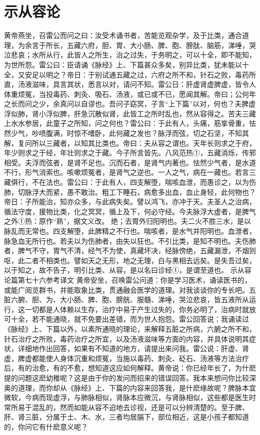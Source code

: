 \documentclass[a4paper,12pt,UTF8,twoside]{ctexbook}
\begin{document}
\chapter{示从容论}

黄帝燕坐，召雷公而问之曰：汝受术诵书者，苦能览观杂学，及于比类，通合道理，为余言于所长，五藏六府，胆、胃、大小肠、脾、胞、膀肽、脑筋，涕唾，哭泣悲哀；水所从行，此皆人之所生，治之过失，于务明之，可以十全，即不能知，为世所怨。雷公曰：臣请诵《脉经》上、下篇甚众多矣，别异比类，犹未能以十全，又安足以明之？帝日：于别试通五藏之过，六府之所不和，针石之败，毒药所直，汤液滋味，具言其状，悉言以对，请问不知。雷公日：肝虚肾虚脾虚，皆令人体重烦冤，当投毒药、刺灸、吸石、汤液，或已或不已，愿闻其解。帝曰；公何年之长而问之少，余真问以自谬也。吾问子窈冥，子言“上下篇”以对，何也？夫脾虚浮似肺，肾小浮似脾，肝急沉散似肾，此皆工之所时乱也，然从容得之。苦夫三藏上水水参居，此童子之所知，问之何也？雷公曰：于此有人，头痛，筋挛骨重，怯然少气，吵喷腹满，时惊不嗜卧，此何藏之发也？脉浮而弦，切之石坚，不知其解，复问所以三藏者，以知其比类也。帝曰：夫从容之谓也。天年长则求之于府，年少则求之于经，年壮则求之于藏。今子所言皆先。八风范热①，五藏消烁，传邪相受。夫浮而弦者，是肾不足也。沉而石者，是肾气内著也。怯然少气者，是水道不行，形气消索也。咳嗽烦冤者，是肾气之逆也。一人之气，病在一藏也。若言三藏俱行，不在法也。雷公曰：于此有人，四支解堕，喘咳血泄，而愚诊之，以为伤肺，切脉浮大而紧，愚不敢治。粗工下睡石，病愈多出血，血止身轻，此何物也？帝日：子所能治，知亦众多，与此病失矣。譬以鸿飞，亦冲于天。夫圣人之治病，循法守度，援物比类，化之冥冥，循上及下，何必守经。今夫脉浮大虚者，是脾气之外①热：原作“熟”，据文义改。
绝；去胃外归阳明也。夫二火不胜三水，是以脉乱而无常也。四支解堕，此脾精之不行也。喘咳者，是水气并阳明也。血泄者，脉急血无所行也。若夫以为伤肺者，由失以狂也。不引比类，是知不明也。夫伤肺者，脾气不守，胃气不清，经气不为使，真藏坏决，经脉傍绝，五藏漏泄，不烟则呕，此二者不相类也。譬如天之无形，地之无理，白与黑相去远矣。是失吾过矣，以于知之，故不告子，明引比类、从容，是以名曰诊经①，是谓至道也。
示从容论篇第七十六参考译文
黄帝安坐，召唤雷公问道：你是学习医术，诵读医书的，或能广阅览群书，并能取象比类，贯通融会医学的道理。对我谈谈你的专长吧。五脏六腑、胆、为、大小肠、脾、胞、膀胱、服髓、涕唾，哭泣悲哀，皆五液所从运行，这一切都是人体赖以生存，治疗中易于产生过失的，你务必明了，治病时就放可十全，若不能通晓，就不免要出差错，而为世人抱怨。雷公回答说：我诵读过《脉经》上、下篇以外，以素所通晓的理论，来解释五脏之所病，六腑之所不和，针石治疗之所败，毒药治疗之所宜，以及汤液滋味等方面的内容，并具体说明其症状，详细地作出回答，如果有不知道的地方，请提出来问我。雷公说：肝虚、肾虚，脾虚都能使人身体沉重和烦冤，当施以毒药、刺灸、砭石、汤液等方法治疗后，有的治愈，有的不愈，想知道这应如何解释。黄帝说：你已经年长了，为什麽提的问题这麽幼稚呢？这是由于你的发问而招来的错误回答。我本来想问你比较深奥的道理，而你却从《脉经》上、下篇的内容来回答我，是什麽缘故呢？脾脉本宜微软，今病而现虚浮，与肺脉相似，肾脉本应微沉，与肾脉相似，这些都是医生时常所易于混乱的，然而如能从容不迫地去诊视，还是可以分辨清楚的。至于脾、肝、肾三脏，分属于土、木、水，三者均居膈下，部位相近，这是小孩子都知道的，你问它有什麽意义呢？
\end{document}
